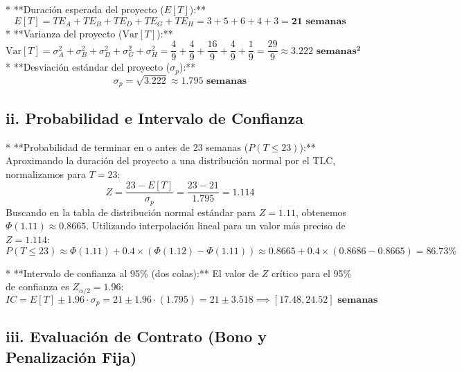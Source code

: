 \documentclass[11pt, a4paper]{article}
\begin{document}
\begin{center}
\end{center}

* **Duración esperada del proyecto ($E[T]$):**
  \[
    E[T] = TE_A + TE_B + TE_D + TE_G + TE_H = 3 + 5 + 6 + 4 + 3 = \mathbf{21 \text{ semanas}}
  \]
* **Varianza del proyecto ($\text{Var}[T]$):**
  \[
    \text{Var}[T] = \sigma_A^2 + \sigma_B^2 + \sigma_D^2 + \sigma_G^2 + \sigma_H^2 = \frac{4}{9} + \frac{4}{9} + \frac{16}{9} + \frac{4}{9} + \frac{1}{9} = \frac{29}{9} \approx \mathbf{3.222 \text{ semanas}^2}
  \]
* **Desviación estándar del proyecto ($\sigma_p$):**
  \[
    \sigma_p = \sqrt{3.222} \approx \mathbf{1.795 \text{ semanas}}
  \]

\subsection*{ii. Probabilidad e Intervalo de Confianza}

* **Probabilidad de terminar en o antes de 23 semanas ($P(T \le 23)$):**
  Aproximando la duración del proyecto a una distribución normal por el TLC, normalizamos para $T = 23$:
  \[
    Z = \frac{23 - E[T]}{\sigma_p} = \frac{23 - 21}{1.795} = 1.114
  \]
  Buscando en la tabla de distribución normal estándar para $Z = 1.11$, obtenemos $\Phi(1.11) \approx 0.8665$.
  Utilizando interpolación lineal para un valor más preciso de $Z = 1.114$:
  \[
    P(T \le 23) \approx \Phi(1.11) + 0.4 \times (\Phi(1.12) - \Phi(1.11)) \approx 0.8665 + 0.4 \times (0.8686 - 0.8665) = \mathbf{86.73\%}
  \]

* **Intervalo de confianza al 95\% (dos colas):**
  El valor de $Z$ crítico para el 95\% de confianza es $Z_{\alpha/2} = 1.96$:
  \[
    IC = E[T] \pm 1.96 \cdot \sigma_p = 21 \pm 1.96 \cdot (1.795) = 21 \pm 3.518 \implies \mathbf{[17.48, 24.52] \text{ semanas}}
  \]

\subsection*{iii. Evaluación de Contrato (Bono y Penalización Fija)}
\end{document}
